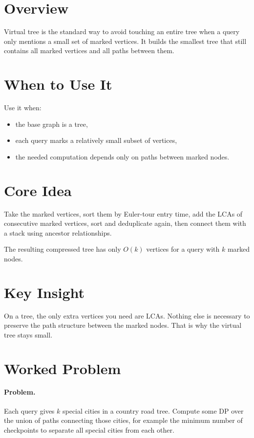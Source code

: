 \section*{Overview}

Virtual tree is the standard way to avoid touching an entire tree when a query only mentions a small set of marked
vertices. It builds the smallest tree that still contains all marked vertices and all paths between them.

\section*{When to Use It}

Use it when:

\begin{itemize}
  \item the base graph is a tree,
  \item each query marks a relatively small subset of vertices,
  \item the needed computation depends only on paths between marked nodes.
\end{itemize}

\section*{Core Idea}

Take the marked vertices, sort them by Euler-tour entry time, add the LCAs of consecutive marked vertices, sort and
deduplicate again, then connect them with a stack using ancestor relationships.

The resulting compressed tree has only \(O(k)\) vertices for a query with \(k\) marked nodes.

\section*{Key Insight}

On a tree, the only extra vertices you need are LCAs. Nothing else is necessary to preserve the path structure between
the marked nodes. That is why the virtual tree stays small.

\section*{Worked Problem}

\paragraph{Problem.}
Each query gives \(k\) special cities in a country road tree. Compute some DP over the union of paths connecting those
cities, for example the minimum number of checkpoints to separate all special cities from each other.

